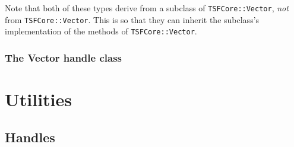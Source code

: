 Note that both of these types derive from a subclass of {\tt TSFCore::Vector}, 
{\it not} from {\tt TSFCore::Vector}. This is so that they can inherit
the subclass's implementation of the methods of {\tt TSFCore::Vector}. 

\subsubsection{The Vector handle class}

\section{Utilities}

\subsection{Handles}

